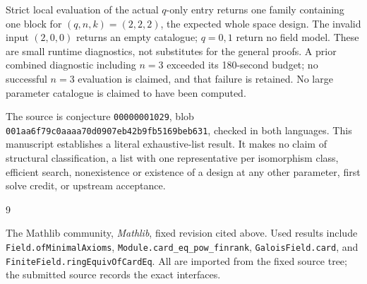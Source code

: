 \documentclass[11pt]{article}
\begin{document}
Strict local evaluation of the actual $q$-only entry returns one
family containing one block for $(q,n,k)=(2,2,2)$, the expected whole
space design. The invalid input $(2,0,0)$ returns an empty catalogue;
$q=0,1$ return no field model. These are small runtime diagnostics,
not substitutes for the general proofs. A prior combined diagnostic
including $n=3$ exceeded its 180-second budget; no successful $n=3$
evaluation is claimed, and that failure is retained. No large
parameter catalogue is claimed to have been computed.

The source is conjecture \texttt{00000001029}, blob
\texttt{001aa6f79c0aaaa70d0907eb42b9fb5169beb631}, checked in both
languages. This manuscript establishes a literal exhaustive-list
result. It makes no claim of structural classification, a list
with one representative per isomorphism class, efficient search,
nonexistence or existence of a design at any other parameter, first
solve credit, or upstream acceptance.

\begin{thebibliography}{9}
\raggedright
{}
The Mathlib community, \emph{Mathlib}, fixed revision cited above.
Used results include \texttt{Field.ofMinimalAxioms},
\texttt{Module.card\_eq\_pow\_finrank},
\texttt{GaloisField.card}, and
\texttt{FiniteField.ringEquivOfCardEq}. All are imported from the
fixed source tree; the submitted source records the exact interfaces.
\end{thebibliography}
\end{document}
